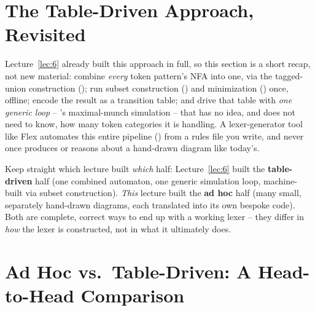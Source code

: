 \documentclass[full-course-notes.tex]{subfiles}
\begin{document}
\section{The Table-Driven Approach, Revisited}
\label{sec:l7-tabledriven-recap}

\dbtag Lecture~\ref{lec:6} already built this approach in full, so this section is a short
recap, not new material: combine \emph{every} token pattern's NFA into one, via the tagged-union
construction (); run subset construction
() and minimization () once, offline;
encode the result as a transition table; and drive that table with \emph{one generic loop} --
's maximal-munch simulation -- that has no idea, and does not
need to know, how many token categories it is handling. A lexer-generator tool like Flex
automates this entire pipeline () from a rules file you write, and
never once produces or reasons about a hand-drawn diagram like today's.

\begin{examfocus}
Keep straight which lecture built \emph{which} half: Lecture~\ref{lec:6} built the
\textbf{table-driven} half (one combined automaton, one generic simulation loop, machine-built
via subset construction). \emph{This} lecture built the \textbf{ad hoc} half (many small,
separately hand-drawn diagrams, each translated into its own bespoke code). Both are complete,
correct ways to end up with a working lexer -- they differ in \emph{how} the lexer is
constructed, not in what it ultimately does.
\end{examfocus}

\section{Ad Hoc vs.\ Table-Driven: A Head-to-Head Comparison}
\label{sec:l7-comparison}
\end{document}
